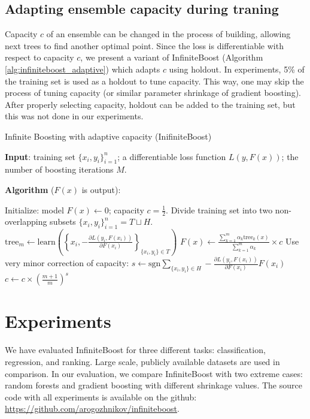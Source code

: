 \subsection{Adapting ensemble capacity during traning}

Capacity $c$ of an ensemble can be changed in the process of building, allowing next trees to find another optimal point.
Since the loss is differentiable with respect to capacity $c$,
we present a variant of InfiniteBoost (Algorithm \ref{alg:infiniteboost_adaptive}) which adapts $c$ using holdout.
In experiments, 5\% of the training set is used as a holdout to tune capacity.
This way, one may skip the process of tuning capacity (or similar parameter shrinkage of gradient boosting).
After properly selecting capacity, holdout can be added to the training set, but this was not done in our experiments.

\begin{algorithm}[!h]
  \caption{Infinite Boosting with adaptive capacity (InifiniteBoost)}\label{alg:infiniteboost_adaptive}
  {\bf Input}: training set $\{x_i, y_i\}_{i=1}^n$; a differentiable loss function $L(y, F(x))$; the number of boosting iterations $M$.

  {\bf Algorithm} ($F(x)$ is output):
  \begin{algorithmic}
    \State Initialize: model $F(x) \gets 0$; capacity $c=\frac{1}{2}$.
    \State Divide training set into two non-overlapping subsets $\{x_i, y_i\}_{i=1}^n=T\sqcup H$.
      \State $\text{tree}_m \gets \text{learn}\left(\left\{x_i, -\frac{\partial L(y_i, F(x_i))}{\partial F(x_i)}\right\}_{\{x_i, y_i\}\in T}\right)$
      \State $F(x) \gets \frac{\sum_{k=1}^m \alpha_k \text{tree}_k(x)}{\sum_{k=1}^m \alpha_k} \times c$
      \State Use very minor correction of capacity:
      \State $s \gets \text{sgn} \sum_{\{x_i, y_i\}\in H} -\frac{\partial L(y_i, F(x_i))}{\partial F(x_i)} F(x_i)$
      \State $c \gets c\times \left(\frac{m+1}{m}\right)^s$
    \EndFor
  \end{algorithmic}
\end{algorithm}

\section{Experiments}
We have evaluated InfiniteBoost for three different tasks: classification, regression, and ranking. 
Large scale, publicly available datasets are used in comparison. 
In our evaluation, we compare InfiniteBoost with two extreme cases: random forests and gradient boosting with different shrinkage values.
The source code with all experiments is available on the github: \url{https://github.com/arogozhnikov/infiniteboost}.

